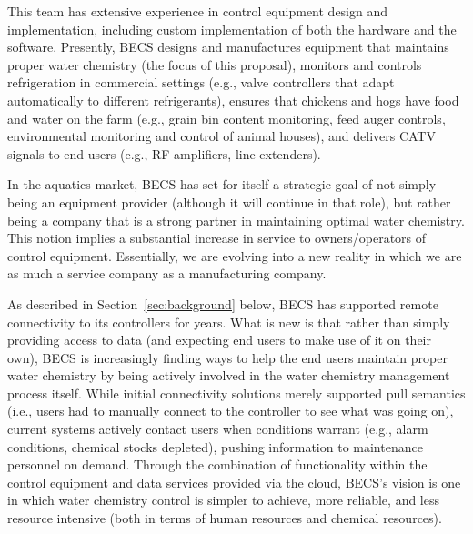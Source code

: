 This team has extensive experience in control equipment design and
implementation, including custom implementation of both the hardware and
the software. Presently, BECS designs and manufactures equipment that maintains
proper water chemistry (the focus of this proposal), monitors and controls
refrigeration in commercial settings (e.g., valve controllers that adapt
automatically to different refrigerants), ensures that chickens and hogs
have food and water on the farm (e.g., grain bin content monitoring,
feed auger controls, environmental monitoring and control of animal houses),
and delivers CATV signals to end users (e.g., RF amplifiers, line extenders).

In the aquatics market, BECS has set for itself a strategic goal of not
simply being an equipment provider (although it will continue in that
role), but rather being a company that is a strong partner in maintaining
optimal water chemistry. This notion implies a substantial increase
in service to owners/operators of control equipment.
Essentially, we are evolving into a new reality in which we are as much a
service company as a manufacturing company.

As described in Section~\ref{sec:background} below, BECS has supported
remote connectivity to its controllers for years.  What is new is that
rather than simply providing access to data (and expecting end users
to make use of it on their own), BECS is increasingly finding ways to
help the end users maintain proper water chemistry by being actively involved
in the water chemistry management process itself.
While initial connectivity solutions
merely supported pull semantics (i.e., users had to
manually connect to the controller to
see what was going on), current systems actively contact users when
conditions warrant (e.g., alarm conditions, chemical stocks depleted),
pushing information to maintenance personnel on demand.
Through the combination of functionality within the control equipment 
and data services provided via the cloud, BECS's vision is one in
which water chemistry control is simpler to achieve, more reliable,
and less resource intensive (both in terms of human resources and
chemical resources).

